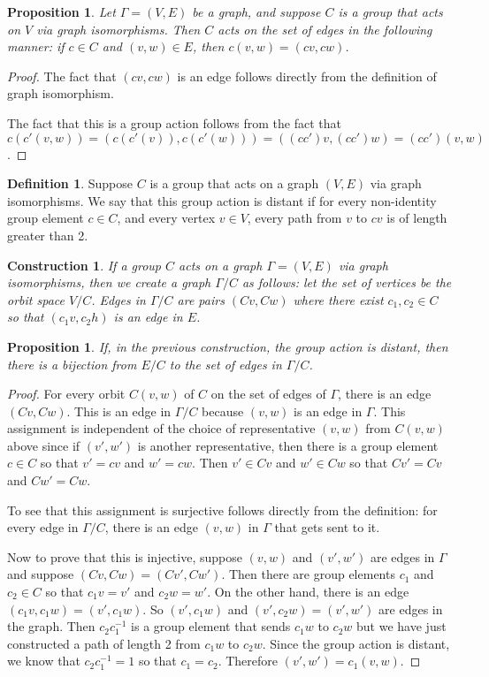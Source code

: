 \documentclass[12pt,twoside,singlespace]{article}
\numberwithin{equation}{section}
\newtheorem{prop}[equation]{Proposition}
\newtheorem{construction}[equation]{Construction}
\theoremstyle{definition}
\newtheorem{definition}[equation]{Definition}
\begin{document}
\begin{prop}
Let $\Gamma=(V,E)$ be a graph, and suppose $C$ is a group that acts on $V$ via graph isomorphisms.  Then $C$ acts on the set of edges in the following manner: if $c\in C$ and $(v,w)\in E$, then $c(v,w)=(cv,cw)$.
\end{prop}
\begin{proof}
The fact that $(cv,cw)$ is an edge follows directly from the definition of graph isomorphism.

The fact that this is a group action follows from the fact that $c(c'(v,w))=(c(c'(v)),c(c'(w)))=((cc')v,(cc')w)=(cc')(v,w)$.
\end{proof}

\begin{definition}
Suppose $C$ is a group that acts on a graph $(V,E)$ via graph isomorphisms.  We say that this group action is distant if for every non-identity group element $c\in C$, and every vertex $v\in V$, every path from $v$ to $cv$ is of length greater than 2.
\end{definition}

\begin{construction}
If a group $C$ acts on a graph $\Gamma=(V,E)$ via graph isomorphisms, then we create a graph $\Gamma/C$ as follows: let the set of vertices be the orbit space $V/C$.  Edges in $\Gamma/C$ are pairs $(Cv,Cw)$ where there exist $c_1, c_2\in C$ so that $(c_1v,c_2h)$ is an edge in $E$.
\end{construction}

\begin{prop}
\label{prop:distiso}
If, in the previous construction, the group action is distant, then there is a bijection from $E/C$ to the set of edges in $\Gamma/C$.
\end{prop}
\begin{proof}
For every orbit $C(v,w)$ of $C$ on the set of edges of $\Gamma$, there is an edge $(Cv,Cw)$.  This is an edge in $\Gamma/C$ because $(v,w)$ is an edge in $\Gamma$.  This assignment is independent of the choice of representative $(v,w)$ from $C(v,w)$ above since if $(v',w')$ is another representative, then there is a group element $c\in C$ so that $v'=cv$ and $w'=cw$.  Then $v'\in Cv$ and $w'\in Cw$ so that $Cv'=Cv$ and $Cw'=Cw$.

To see that this assignment is surjective follows directly from the definition: for every edge in $\Gamma/C$, there is an edge $(v,w)$ in $\Gamma$ that gets sent to it.

Now to prove that this is injective, suppose $(v,w)$ and $(v',w')$ are edges in $\Gamma$ and suppose $(Cv,Cw)=(Cv',Cw')$.  Then there are group elements $c_1$ and $c_2\in C$ so that $c_1v=v'$ and $c_2w=w'$.  On the other hand, there is an edge $(c_1v,c_1w)=(v',c_1w)$.  So $(v',c_1w)$ and $(v',c_2w)=(v',w')$ are edges in the graph.  Then $c_2c_1^{-1}$ is a group element that sends $c_1w$ to $c_2w$ but we have just constructed a path of length 2 from $c_1w$ to $c_2w$.  Since the group action is distant, we know that $c_2c_1^{-1}=1$ so that $c_1=c_2$.  Therefore $(v',w')=c_1(v,w)$.
\end{proof}
\end{document}
